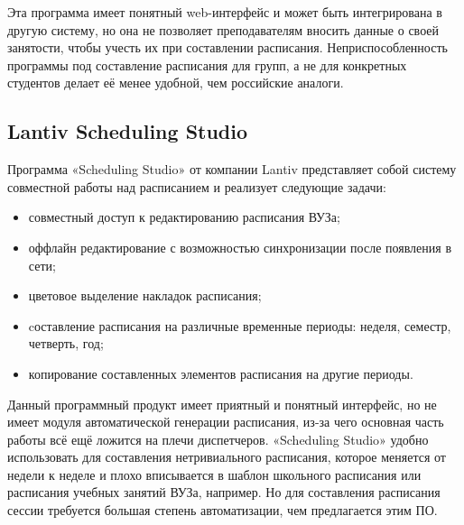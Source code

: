 Эта программа имеет понятный web-интерфейс и может быть интегрирована в другую систему, но она не позволяет преподавателям вносить данные о своей занятости, чтобы учесть их при составлении расписания. Неприспособленность программы под составление расписания для групп, а не для конкретных студентов делает её менее удобной, чем российские аналоги.

\subsection {Lantiv Scheduling Studio} 
Программа «Scheduling Studio» \cite{lantiv} от компании Lantiv представляет собой систему совместной работы над расписанием и реализует следующие задачи:

\begin{itemize}
	\item совместный доступ к редактированию расписания ВУЗа;
	\item оффлайн редактирование с возможностью синхронизации после появления в сети;
	\item цветовое выделение накладок расписания;
	\item cоставление расписания на различные временные периоды: неделя, семестр, четверть, год;
	\item копирование составленных элементов расписания на другие периоды.
\end{itemize}

Данный программный продукт имеет приятный и понятный интерфейс, но не имеет модуля автоматической генерации расписания, из-за чего основная часть работы всё ещё ложится на плечи диспетчеров. «Scheduling Studio» удобно использовать для составления нетривиального расписания, которое меняется от недели к неделе и плохо вписывается в шаблон школьного расписания или расписания учебных занятий ВУЗа, например. Но для составления расписания сессии требуется большая степень автоматизации, чем предлагается этим ПО.

